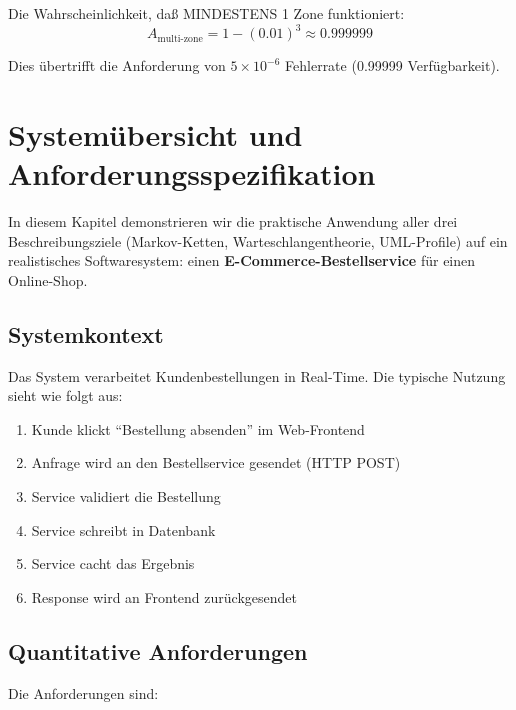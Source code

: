 \documentclass[a4paper,11pt]{article}
\theoremstyle{definition}
\begin{document}
Die Wahrscheinlichkeit, daß MINDESTENS 1 Zone funktioniert:
\[
    A_{\text{multi-zone}} = 1 - (0.01)^3 \approx 0.999999
\]

Dies übertrifft die Anforderung von $5 \times 10^{-6}$ Fehlerrate (0.99999 Verfügbarkeit).


\maketitle

\section{Systemübersicht und Anforderungsspezifikation}

In diesem Kapitel demonstrieren wir die praktische Anwendung aller drei Beschreibungsziele 
(Markov-Ketten, Warteschlangentheorie, UML-Profile) auf ein realistisches Softwaresystem: 
einen \textbf{E-Commerce-Bestellservice} für einen Online-Shop.

\subsection{Systemkontext}

Das System verarbeitet Kundenbestellungen in Real-Time. Die typische Nutzung sieht wie folgt aus:
\begin{enumerate}
    \item Kunde klickt ``Bestellung absenden'' im Web-Frontend
    \item Anfrage wird an den Bestellservice gesendet (HTTP POST)
    \item Service validiert die Bestellung
    \item Service schreibt in Datenbank
    \item Service cacht das Ergebnis
    \item Response wird an Frontend zurückgesendet
\end{enumerate}

\subsection{Quantitative Anforderungen}

Die Anforderungen sind:
\end{document}
